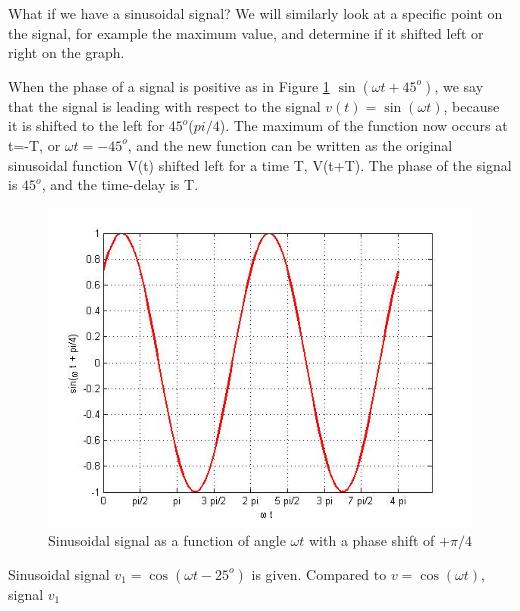 \documentclass{ximera}
\begin{document}
\begin{example}

What if we have a sinusoidal signal? We will similarly look at a specific point on the signal, for example the maximum value, and determine if it shifted left or right on the graph.

When the phase of a signal is positive as in Figure \ref{sinPlus45Ph} $ \sin (\omega t + 45^o)$, we say that the signal is leading with respect to the signal $v(t)= \sin (\omega t)$, because it is shifted to the left for $45^o$($pi/4$). The maximum of the function now occurs at t=-T, or $\omega t = -45^o$, and the new function can be written as the original sinusoidal function V(t) shifted left for a time T,  V(t+T). The phase of the signal is $45^o$, and the time-delay is T. 


\begin{figure}[htbp]
\includegraphics[scale=0.4]{../jpg/cpef5.jpg}
\caption{Sinusoidal signal as a function of angle $\omega t$ with a phase shift of $+\pi/4$}
\label{sinPlus45Ph}
\end{figure}

\end{example}



\begin{question}
Sinusoidal signal $v_1=\cos(\omega t - 25^o)$ is given. Compared to $v=\cos(\omega t)$, signal $v_1$
\begin{multipleChoice}  
\end{multipleChoice}
\end{question}
\end{document}
